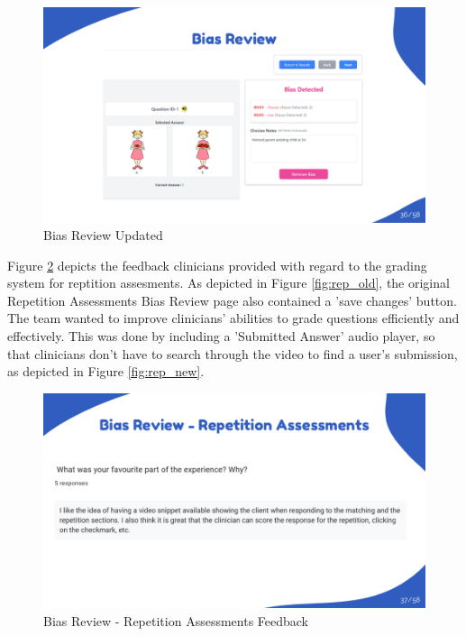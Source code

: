 \documentclass{article}
\begin{document}
\begin{figure}[H]
  \centering
  \includegraphics[width=\textwidth]{images/slide36.png}
  \caption{Bias Review Updated}
  \label{fig:bias_feedback_new}
\end{figure}

Figure \ref{fig:rep_feedback} depicts the feedback clinicians provided with regard to the grading system for reptition assesments.
As depicted in Figure \ref{fig:rep_old}, the original Repetition Assessments Bias Review page also contained a 'save changes' button.
The team wanted to improve clinicians' abilities to grade questions efficiently and effectively. This was done by including a 'Submitted Answer' audio player,
so that clinicians don't have to search through the video to find a user's submission, as depicted in Figure \ref{fig:rep_new}.

\begin{figure}[H]
  \centering
  \includegraphics[width=\textwidth]{images/slide37.png}
  \caption{Bias Review - Repetition Assessments Feedback}
  \label{fig:rep_feedback}
\end{figure}
\end{document}
